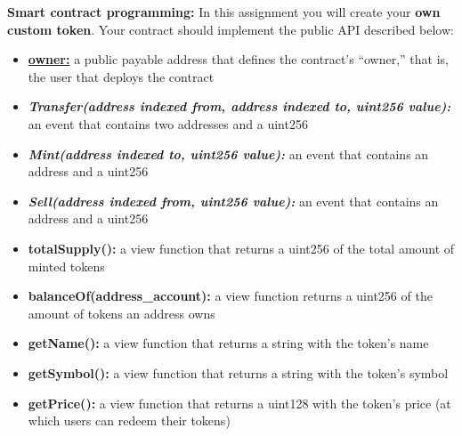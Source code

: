 \documentclass[12pt,addpoints,answers]{exam}
\begin{document}
\begin{questions}
\begin{parts}
\end{parts}

\newpage

\question \textbf{Smart contract programming:}  In this assignment you will create your {\bf own custom token}. Your contract should implement the public API described below:

\begin{itemize}
\item \underline{\textbf{owner:}} a public payable address that defines the contract’s ``owner,'' that is, the user that deploys the contract
\item \textbf{\textit{Transfer(address indexed from, address indexed to, uint256 value):}} an event that contains two addresses and a uint256
\item \textbf{\textit{Mint(address indexed to, uint256 value):}} an event that contains an address and a uint256
\item \textbf{\textit{Sell(address indexed from, uint256 value):}} an event that contains an address and a uint256

\item \textbf{totalSupply():} a view function that returns a uint256 of the total amount of minted tokens
\item \textbf{balanceOf(address\_account):} a view function returns a uint256 of the amount of tokens
an address owns
\item \textbf{getName():} a view function that returns a string with the token’s name
\item \textbf{getSymbol():} a view function that returns a string with the token’s symbol
\item \textbf{getPrice():} a view function that returns a uint128 with the token’s price (at which users can
redeem their tokens)


\end{itemize}
\end{questions}
\end{document}

